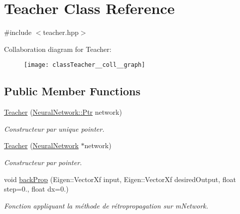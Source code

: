 \hypertarget{classTeacher}{}\section{Teacher Class Reference}
\label{classTeacher}


{\ttfamily \#include $<$teacher.\+hpp$>$}



Collaboration diagram for Teacher\+:\nopagebreak
\begin{figure}[H]
\begin{center}
\leavevmode
\texttt{[image: classTeacher\_\_coll\_\_graph]}
\end{center}
\end{figure}
\subsection*{Public Member Functions}
\begin{DoxyCompactItemize}
\item 
\hyperlink{classTeacher_a8ca95fc7a29e082a676d420b9fd8fd67}{Teacher} (\hyperlink{classNeuralNetwork_a31de381df65f261fd0f38e0559995d1a}{Neural\+Network\+::\+Ptr} network)
\begin{DoxyCompactList}\small\item\em Constructeur par unique pointer. \end{DoxyCompactList}\item 
\hyperlink{classTeacher_afd32ab70242f2c5886d030a5e7d05919}{Teacher} (\hyperlink{classNeuralNetwork}{Neural\+Network} $\ast$network)
\begin{DoxyCompactList}\small\item\em Constructeur par pointer. \end{DoxyCompactList}\item 
void \hyperlink{classTeacher_a99fc69c5319be890394d2c8503e217c8}{back\+Prop} (Eigen\+::\+Vector\+Xf input, Eigen\+::\+Vector\+Xf desired\+Output, float step=0., float dx=0.)
\begin{DoxyCompactList}\small\item\em Fonction appliquant la méthode de rétropropagation sur m\+Network. \end{DoxyCompactList}\end{DoxyCompactItemize}

